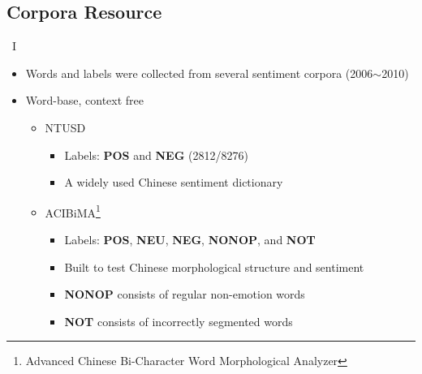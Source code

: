 \documentclass[compress]{beamer}
\begin{document}
    \subsection{Corpora Resource}
        \begin{frame}{\subsecname\ I}
            \begin{itemize}
                \item Words and labels were collected from several sentiment corpora (2006$\sim$2010)
                \item Word-base, context free
                \begin{itemize}
                    \item NTUSD
                        \begin{itemize}
                            \item Labels: \textbf{POS} and \textbf{NEG} (2812/8276) 
                            \item A widely used Chinese sentiment dictionary
                        \end{itemize}
                    \item ACIBiMA\footnote{Advanced Chinese Bi-Character Word Morphological Analyzer}
                        \begin{itemize}
                            \item Labels: \textbf{POS}, \textbf{NEU}, \textbf{NEG}, \textbf{NONOP}, and \textbf{NOT}
                            \item Built to test Chinese morphological structure and sentiment
                            \item \textbf{NONOP} consists of regular non-emotion words
                            \item \textbf{NOT} consists of incorrectly segmented words
                        \end{itemize}
                \end{itemize}
            \end{itemize}
        \end{frame}
\end{document}
